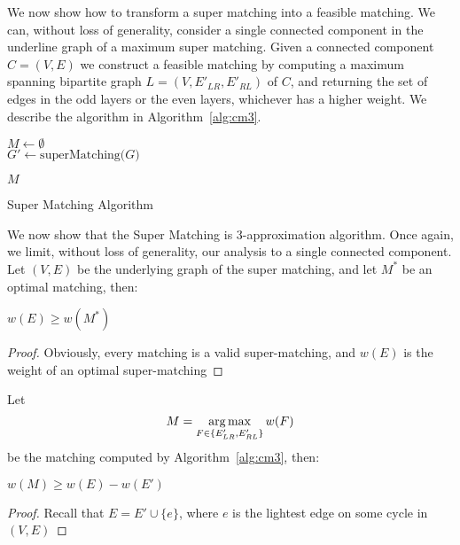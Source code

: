 We now show how to transform a super matching into a feasible matching.
We can, without loss of generality, 
consider a single connected component in the underline graph of a maximum super matching.
Given a connected component $C = (V, E)$ we construct a feasible matching by
computing a maximum spanning bipartite graph $L = (V, E'_{LR}, E'_{RL})$ of $C$,
and returning the set of edges in the odd layers or the even layers,
whichever has a higher weight. 
We describe the algorithm in Algorithm~\ref{alg:cm3}.

\begin{algorithm}
\label{alg:cm3}

$M \leftarrow \emptyset$								\\
$G' \leftarrow \text{superMatching($G$)}$				\\


\Return $M$
\caption{Super Matching Algorithm}
\end{algorithm}

We now show that the Super Matching is 3-approximation algorithm.
Once again, we limit, without loss of generality, 
our analysis to a single connected component.
Let $(V, E)$ be the underlying graph of the super matching, 
and let $M^*$ be an optimal matching, then:
\begin{lemma}
\label{lm:super-geq-m^*}
$w(E) \geq w(M^*)$
\end{lemma}

\begin{proof}
Obviously, every matching is a valid super-matching, 
and $w(E)$ is the weight of an optimal super-matching 
\end{proof}

Let
$$ M = \operatorname*{arg\,max}_{F \in \{ E'_{LR}, E'_{RL} \}}{w(F)} $$
be the matching computed by Algorithm~\ref{alg:cm3}, then:

\begin{lemma}
\label{lm:more_than_e}
$w(M) \geq w(E) - w(E')$
\end{lemma}

\begin{proof}
Recall that $E = E' \cup \{e\}$, where $e$ is the lightest edge on some cycle in $(V, E)$ 
\end{proof}

